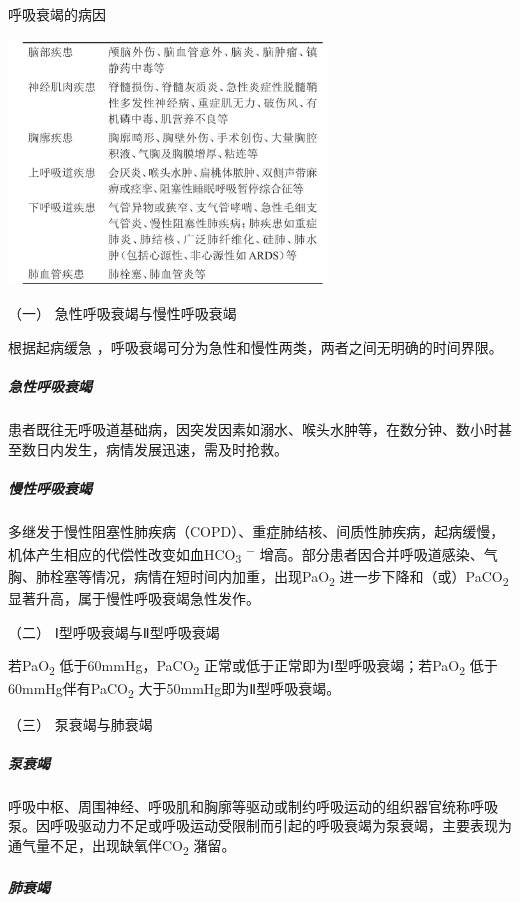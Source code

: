 \begin{table}[htbp]
\centering
\caption{呼吸衰竭的病因}
\label{tab28-1}
\includegraphics[width=3.33333in,height=2.57292in]{./images/Image00112.jpg}
\end{table}

\hypertarget{text00076.htmlux5cux23CHP3-4-1-1-1}{}
（一） 急性呼吸衰竭与慢性呼吸衰竭

根据起病缓急 ，呼吸衰竭可分为急性和慢性两类，两者之间无明确的时间界限。

\subparagraph{急性呼吸衰竭}

患者既往无呼吸道基础病，因突发因素如溺水、喉头水肿等，在数分钟、数小时甚至数日内发生，病情发展迅速，需及时抢救。

\subparagraph{慢性呼吸衰竭}

多继发于慢性阻塞性肺疾病（COPD）、重症肺结核、间质性肺疾病，起病缓慢，机体产生相应的代偿性改变如血HCO\textsubscript{3}
\textsuperscript{−}
增高。部分患者因合并呼吸道感染、气胸、肺栓塞等情况，病情在短时间内加重，出现PaO\textsubscript{2}
进一步下降和（或）PaCO\textsubscript{2}
显著升高，属于慢性呼吸衰竭急性发作。

\hypertarget{text00076.htmlux5cux23CHP3-4-1-1-2}{}
（二） Ⅰ型呼吸衰竭与Ⅱ型呼吸衰竭

若PaO\textsubscript{2} 低于60mmHg，PaCO\textsubscript{2}
正常或低于正常即为Ⅰ型呼吸衰竭；若PaO\textsubscript{2}
低于60mmHg伴有PaCO\textsubscript{2} 大于50mmHg即为Ⅱ型呼吸衰竭。

\hypertarget{text00076.htmlux5cux23CHP3-4-1-1-3}{}
（三） 泵衰竭与肺衰竭

\subparagraph{泵衰竭}

呼吸中枢、周围神经、呼吸肌和胸廓等驱动或制约呼吸运动的组织器官统称呼吸泵。因呼吸驱动力不足或呼吸运动受限制而引起的呼吸衰竭为泵衰竭，主要表现为通气量不足，出现缺氧伴CO\textsubscript{2}
潴留。

\subparagraph{肺衰竭}


